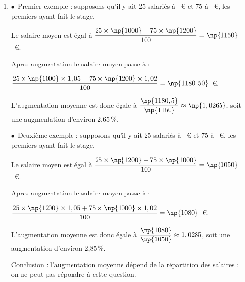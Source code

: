 \begin{enumerate}
\begin{enumerate}
Soit $p(X\leqslant5)$. À la calculatrice, $p(X\leqslant5)\approx 0,617$.\\ Cela signifie que la probabilité qu'au plus 5 salariés aient effectué le stage, est égale à 0,617.
	 
	 La probabilité qu'au moins 6 salariés suivent le stage est d'environ 0,617.
	\item $p(X\geqslant 6)=1-p(X<6)=1-p(X\leqslant5)\approx 1-0,617\approx0,383$
\end{enumerate}
\item 

$\bullet~~$Premier exemple : supposons qu'il y ait 25 salariés à ~\euro{} et 75 à ~\euro{}, les premiers ayant fait le stage.

Le salaire moyen est égal à $\dfrac{25 \times \np{1000} + 75 \times \np{1200}}{100} = \np{1150}$~\euro.

Après augmentation le salaire moyen passe à :

$\dfrac{25 \times \np{1000} \times 1,05 + 75 \times\np{1200}\times 1,02}{100} = \np{1180,50}$~\euro.

L'augmentation moyenne est donc égale à $\dfrac{\np{1180,5}}{\np{1150}}\approx \np{1,0265}$, soit une augmentation d'environ 2,65\,\%.

$\bullet~~$Deuxième exemple : supposons qu'il y ait 25 salariés à ~\euro{} et 75 à ~\euro{}, les premiers ayant fait le stage.

Le salaire moyen est égal à $\dfrac{25 \times \np{1200} + 75 \times \np{1000}}{100} = \np{1050}$~\euro.

Après augmentation le salaire moyen passe à :

$\dfrac{25 \times \np{1200} \times 1,05 + 75 \times\np{1000}\times 1,02}{100} = \np{1080}$~\euro.

L'augmentation moyenne est donc égale à $\dfrac{\np{1080}}{\np{1050}}\approx 1,0285$, soit une augmentation d'environ 2,85\,\%.

Conclusion : l'augmentation moyenne dépend de la répartition des salaires : on ne peut pas répondre à cette question.
\end{enumerate}

\bigskip
